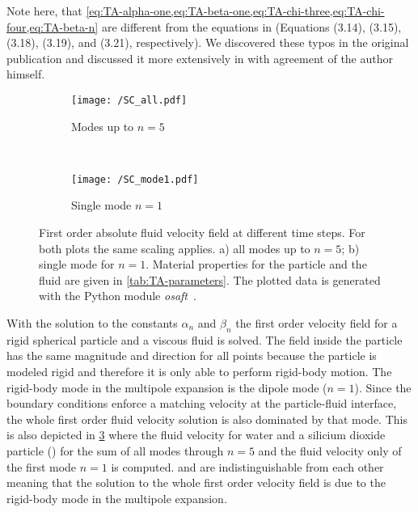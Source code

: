 Note here, that 
\cref{eq:TA-alpha-one,eq:TA-beta-one,eq:TA-chi-three,eq:TA-chi-four,eq:TA-beta-n} 
are different from the equations in  (Equations 
(3.14), (3.15), (3.18), (3.19), and (3.21), respectively). We discovered these 
typos in the original publication and discussed it more extensively in 
 with agreement of the author himself.

\begin{figure}
  \centering
  \begin{subfigure}[b]{\textwidth}
    \centering
    \caption{Modes up to $n=5$}
    \texttt{[image: /SC\_all.pdf]}
    \label{fig:TA-SC_all}
  \end{subfigure}\\%
  \begin{subfigure}[b]{\textwidth}
    \centering
    \caption{Single mode $n=1$}
    \texttt{[image: /SC\_mode1.pdf]}
    \label{fig:TA-SC_mode1}
  \end{subfigure}
  \caption{First order absolute fluid velocity field at different time steps. 
  For both plots the same scaling applies. a) all modes up to $n=5$; b) single 
  mode for $n=1$. Material properties for the particle and the fluid are given 
in \cref{tab:TA-parameters}. The plotted data is generated with the Python 
module \emph{osaft}~\cite{FankhauserPython2022}.}
  \label{fig:TA-SC}
\end{figure}

With the solution to the constants $\alpha_{n}$ and $\beta_{n}$ the first order 
velocity field for a rigid spherical particle and a viscous fluid is solved. 
The field inside the particle has the same magnitude and direction for all 
points because the particle is modeled rigid and therefore it is only able to 
perform rigid-body motion. The rigid-body mode in the multipole expansion is 
the dipole mode ($n=1$). Since the boundary conditions enforce a matching 
velocity at the particle-fluid interface, the whole first order fluid velocity 
solution is also dominated by that mode. This is also depicted in 
\cref{fig:TA-SC} where the fluid velocity for water and a silicium dioxide 
particle (\SiO) for the sum of all modes through $n=5$ and the fluid velocity 
only of the first mode $n=1$ is computed.  and 
 are indistinguishable from each other meaning that the 
solution to the whole first order velocity field is due to the rigid-body mode 
in the multipole expansion.

